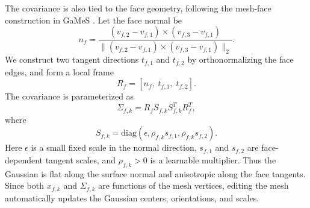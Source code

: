 \documentclass{article}
\begin{document}
The covariance is also tied to the face geometry, following the mesh-face construction in GaMeS \cite{waczynska2024games}. Let the face normal be
\begin{equation}
n_f=
\frac{(v_{f,2}-v_{f,1})\times(v_{f,3}-v_{f,1})}
{\|(v_{f,2}-v_{f,1})\times(v_{f,3}-v_{f,1})\|_2}.
\end{equation}
We construct two tangent directions $t_{f,1}$ and $t_{f,2}$ by orthonormalizing the face edges, and form a local frame
\begin{equation}
R_f=[n_f,\;t_{f,1},\;t_{f,2}].
\end{equation}
The covariance is parameterized as
\begin{equation}
\Sigma_{f,k}
=
R_fS_{f,k}S_{f,k}^{T}R_f^{T},
\end{equation}
where
\begin{equation}
S_{f,k}
=
\mathrm{diag}(\epsilon,\rho_{f,k}s_{f,1},\rho_{f,k}s_{f,2}).
\end{equation}
Here $\epsilon$ is a small fixed scale in the normal direction, $s_{f,1}$ and $s_{f,2}$ are face-dependent tangent scales, and $\rho_{f,k}>0$ is a learnable multiplier. Thus the Gaussian is flat along the surface normal and anisotropic along the face tangents. Since both $x_{f,k}$ and $\Sigma_{f,k}$ are functions of the mesh vertices, editing the mesh automatically updates the Gaussian centers, orientations, and scales.
\end{document}
